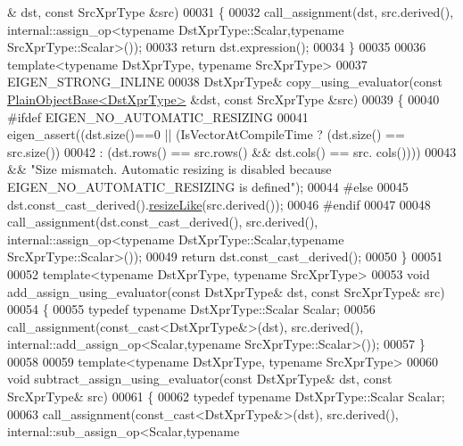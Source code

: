 \begin{DoxyCode}
      & dst, \textcolor{keyword}{const} SrcXprType &src)
00031   \{
00032     call\_assignment(dst, src.derived(), internal::assign\_op<typename DstXprType::Scalar,typename
       SrcXprType::Scalar>());
00033     \textcolor{keywordflow}{return} dst.expression();
00034   \}
00035   
00036   \textcolor{keyword}{template}<\textcolor{keyword}{typename} DstXprType, \textcolor{keyword}{typename} SrcXprType>
00037   EIGEN\_STRONG\_INLINE
00038   DstXprType& copy\_using\_evaluator(\textcolor{keyword}{const} \hyperlink{class_eigen_1_1_plain_object_base}{PlainObjectBase<DstXprType>} &dst, \textcolor{keyword}{const}
       SrcXprType &src)
00039   \{
00040 \textcolor{preprocessor}{    #ifdef EIGEN\_NO\_AUTOMATIC\_RESIZING}
00041     eigen\_assert((dst.size()==0 || (IsVectorAtCompileTime ? (dst.size() == src.size())
00042                                                           : (dst.rows() == src.rows() && dst.cols() == src.
      cols())))
00043                 && \textcolor{stringliteral}{"Size mismatch. Automatic resizing is disabled because EIGEN\_NO\_AUTOMATIC\_RESIZING is
       defined"});
00044 \textcolor{preprocessor}{  #else}
00045     dst.const\_cast\_derived().\hyperlink{class_eigen_1_1_plain_object_base_acc7200947e6399bee847ff37c8270fc8}{resizeLike}(src.derived());
00046 \textcolor{preprocessor}{  #endif}
00047     
00048     call\_assignment(dst.const\_cast\_derived(), src.derived(), internal::assign\_op<typename
       DstXprType::Scalar,typename SrcXprType::Scalar>());
00049     \textcolor{keywordflow}{return} dst.const\_cast\_derived();
00050   \}
00051 
00052   \textcolor{keyword}{template}<\textcolor{keyword}{typename} DstXprType, \textcolor{keyword}{typename} SrcXprType>
00053   \textcolor{keywordtype}{void} add\_assign\_using\_evaluator(\textcolor{keyword}{const} DstXprType& dst, \textcolor{keyword}{const} SrcXprType& src)
00054   \{
00055     \textcolor{keyword}{typedef} \textcolor{keyword}{typename} DstXprType::Scalar Scalar;
00056     call\_assignment(const\_cast<DstXprType&>(dst), src.derived(), internal::add\_assign\_op<Scalar,typename
       SrcXprType::Scalar>());
00057   \}
00058 
00059   \textcolor{keyword}{template}<\textcolor{keyword}{typename} DstXprType, \textcolor{keyword}{typename} SrcXprType>
00060   \textcolor{keywordtype}{void} subtract\_assign\_using\_evaluator(\textcolor{keyword}{const} DstXprType& dst, \textcolor{keyword}{const} SrcXprType& src)
00061   \{
00062     \textcolor{keyword}{typedef} \textcolor{keyword}{typename} DstXprType::Scalar Scalar;
00063     call\_assignment(const\_cast<DstXprType&>(dst), src.derived(), internal::sub\_assign\_op<Scalar,typename

\end{DoxyCode}
